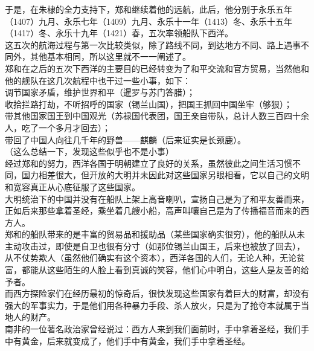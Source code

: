 \begin{multicols}{\theparacolNo}
于是，在朱棣的全力支持下，郑和继续着他的远航，此后，他分别于永乐五年（1407）九月、永乐七年（1409）九月、永乐十一年（1413）冬、永乐十五年（1417）冬、永乐十九年（1421）春，五次率领船队下西洋。\\

这五次的航海过程与第一次比较类似，除了路线不同，到达地方不同、路上遇事不同外，其他基本相同，所以这里就不一一阐述了。\\

郑和在之后的五次下西洋的主要目的已经转变为了和平交流和官方贸易，当然他和他的舰队在这几次航程中也干过一些小事，如下：\\

调节国家矛盾，维护世界和平（暹罗与苏门答腊）；\\

收拾拦路打劫，不听招呼的国家（锡兰山国），把国王抓回中国坐牢（够狠）；\\

带其他国家国王到中国观光（苏禄国代表团，国王亲自带队，总计人数三百四十余人，吃了一个多月才回去）；\\

带回了中国人向往几千年的野兽——麒麟（后来证实是长颈鹿）。\\

（这么总结一下，发现这些似乎也不是小事）\\

经过郑和的努力，西洋各国于明朝建立了良好的关系，虽然彼此之间生活习惯不同，国力相差很大，但开放的大明并未因此对这些国家另眼相看，它以自己的文明和宽容真正从心底征服了这些国家。\\

大明统治下的中国并没有在船队上架上高音喇叭，宣扬自己是为了和平友善而来，正如后来那些拿着圣经，乘坐着几艘小船，高声叫嚷自己是为了传播福音而来的西方人。\\

郑和的船队带来的是丰富的贸易品和援助品（某些国家确实很穷），他的船队从未主动攻击过，即使是自卫也很有分寸（如那位锡兰山国王，后来也被放了回去），从不仗势欺人（虽然他们确实有这个资本），西洋各国的人们，无论人种，无论贫富，都能从这些陌生的人脸上看到真诚的笑容，他们心中明白，这些人是友善的给予者。\\

而西方探险家们在经历最初的惊奇后，很快发现这些国家有着巨大的财富，却没有强大的军事实力，于是他们用各种暴力手段、杀人放火，只是为了抢夺本就属于当地人的财产。\\

南非的一位著名政治家曾经说过：西方人来到我们面前时，手中拿着圣经，我们手中有黄金，后来就变成了，他们手中有黄金，我们手中拿着圣经。\\


\end{multicols}
